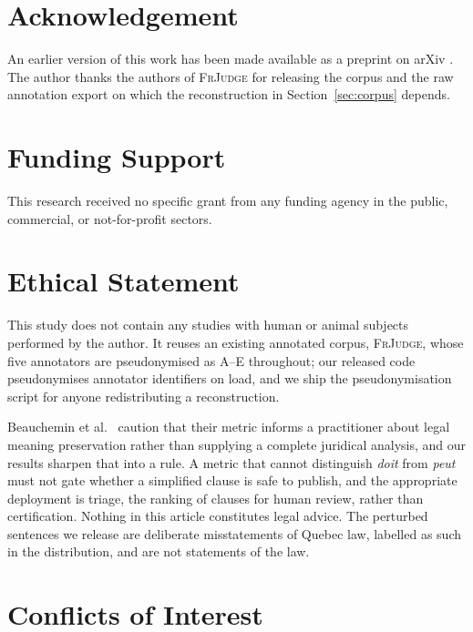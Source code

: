 \documentclass{BVP_JCLLT}
\begin{document}
\section*{Acknowledgement}\label{acknowledgement}

An earlier version of this work has been made available as a preprint on arXiv
\cite{baral2026lexflip}. The author thanks the authors of \textsc{FrJudge} for
releasing the corpus and the raw annotation export on which the reconstruction
in Section~\ref{sec:corpus} depends.

\section*{Funding Support}\label{funding-support}

This research received no specific grant from any funding agency in the public,
commercial, or not-for-profit sectors.

\section*{Ethical Statement}\label{ethical-statement}

This study does not contain any studies with human or animal subjects performed
by the author. It reuses an existing annotated corpus, \textsc{FrJudge}, whose
five annotators are pseudonymised as A--E throughout; our released code
pseudonymises annotator identifiers on load, and we ship the pseudonymisation
script for anyone redistributing a reconstruction.

Beauchemin et al.\ \cite{beauchemin2025judgebert} caution that their metric
informs a practitioner about legal meaning preservation rather than supplying a
complete juridical analysis, and our results sharpen that into a rule. A metric
that cannot distinguish \emph{doit} from \emph{peut} must not gate whether a
simplified clause is safe to publish, and the appropriate deployment is triage,
the ranking of clauses for human review, rather than certification. Nothing in
this article constitutes legal advice. The perturbed sentences we release are
deliberate misstatements of Quebec law, labelled as such in the distribution,
and are not statements of the law.

\section*{Conflicts of Interest}\label{conflicts-of-interest}
\end{document}
